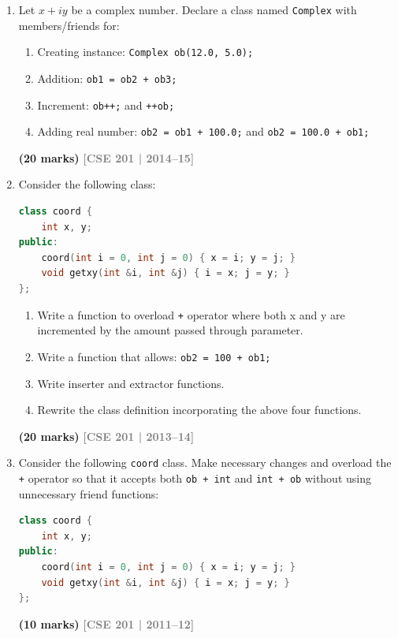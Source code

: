 \documentclass[12pt,a3paper]{article}
\newcommand{\yr}[1]{\hfill\textcolor{gray}{\small\textbf{[#1]}}}
\newcommand{\mk}[1]{\textcolor{orange!70!black}{\small\textbf{(#1 marks)}}}
\begin{document}
\begin{enumerate}
\item Let $x+iy$ be a complex number. Declare a class named \texttt{Complex} with members/friends for:
\begin{enumerate}
  \item Creating instance: \texttt{Complex ob(12.0, 5.0);}
  \item Addition: \texttt{ob1 = ob2 + ob3;}
  \item Increment: \texttt{ob++;} and \texttt{++ob;}
  \item Adding real number: \texttt{ob2 = ob1 + 100.0;} and \texttt{ob2 = 100.0 + ob1;}
\end{enumerate}
\mk{20}
\yr{CSE 201 | 2014--15}






\item Consider the following class:
\begin{lstlisting}[language=C++]
class coord {
    int x, y;
public:
    coord(int i = 0, int j = 0) { x = i; y = j; }
    void getxy(int &i, int &j) { i = x; j = y; }
};
\end{lstlisting}
\begin{enumerate}
  \item Write a function to overload \texttt{+} operator where both x and y are incremented by the amount passed through parameter.
  \item Write a function that allows: \texttt{ob2 = 100 + ob1;}
  \item Write inserter and extractor functions.
  \item Rewrite the class definition incorporating the above four functions.
\end{enumerate}
\mk{20}
\yr{CSE 201 | 2013--14}






\item Consider the following \texttt{coord} class. Make necessary changes and overload the \texttt{+} operator so that it accepts both \texttt{ob + int} and \texttt{int + ob} without using unnecessary friend functions:
\begin{lstlisting}[language=C++]
class coord {
    int x, y;
public:
    coord(int i = 0, int j = 0) { x = i; y = j; }
    void getxy(int &i, int &j) { i = x; j = y; }
};
\end{lstlisting}
\mk{10}
\yr{CSE 201 | 2011--12}


\end{enumerate}
\end{document}
